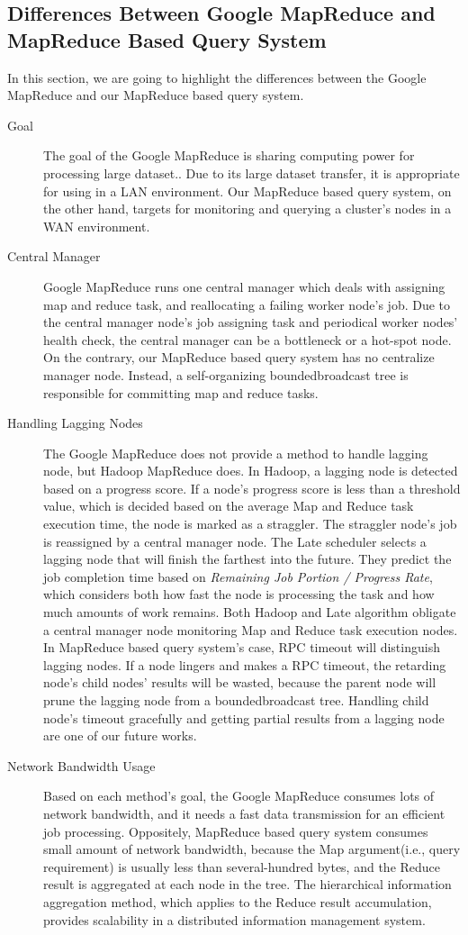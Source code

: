 \documentclass{acm_proc_article-sp}
\begin{document}
\subsection{Differences Between Google MapReduce and MapReduce Based Query System}
In this section, we are going to highlight the differences between the Google MapReduce and our MapReduce based query system.
\begin{description}
\item[Goal]The goal of the Google MapReduce is sharing computing power for processing large dataset.\cite{google_mapreduce}. Due to its large dataset transfer, it is appropriate for using in a LAN environment.
Our MapReduce based query system, on the other hand, targets for monitoring and querying a cluster's nodes in a WAN environment.
\item[Central Manager]Google MapReduce runs one central manager which deals with assigning map and reduce task, and reallocating a failing worker node's job.
Due to the central manager node's job assigning task and periodical worker nodes' health check, the central manager can be a bottleneck or a hot-spot node. 
On the contrary, our MapReduce based query system has no centralize manager node. Instead, a self-organizing boundedbroadcast tree is responsible for committing map and reduce tasks.
\item[Handling Lagging Nodes]The Google MapReduce does not provide a method to handle lagging node, but Hadoop MapReduce does. In Hadoop, a lagging node is detected based on a progress score.
If a node's progress score is less than a threshold value, which is decided based on the average Map and Reduce task execution time, the node is marked as a straggler. The straggler node's job is reassigned by a central manager node.\cite{hadoop}
The Late scheduler\cite{late} selects a lagging node that will finish the farthest into the future. They predict the job completion time based on \textit{Remaining Job Portion / Progress Rate}, which considers both
how fast the node is processing the task and how much amounts of work remains.
Both Hadoop and Late algorithm obligate a central manager node monitoring Map and Reduce task execution nodes. 
In MapReduce based query system's case, RPC timeout will distinguish lagging nodes. If a node lingers and makes a RPC timeout, the retarding node's child nodes' results will be wasted, 
because the parent node will prune the lagging node from a boundedbroadcast tree. Handling child node's timeout gracefully and getting partial results from a lagging node are one of our future works.
\item[Network Bandwidth Usage]Based on each method's goal, the Google MapReduce consumes lots of network bandwidth, and it needs a fast data transmission for an efficient job processing. 
Oppositely, MapReduce based query system consumes small amount of network bandwidth, because the Map argument(i.e., query requirement) is usually less than several-hundred bytes, and the Reduce result is aggregated at each node in the tree.
The hierarchical information aggregation method, which applies to the Reduce result accumulation, provides scalability in a distributed information management system.\cite{astrobe} \cite{treedatamanage}
\end{description} 
\end{document}
